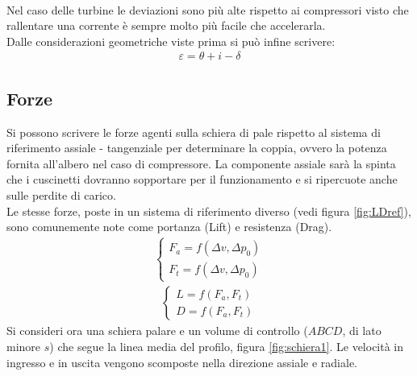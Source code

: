 \\Nel caso delle turbine le deviazioni sono più alte rispetto ai compressori visto che rallentare una corrente è sempre molto più facile che accelerarla.\\
Dalle considerazioni geometriche viste prima si può infine scrivere:
\begin{align*}
\varepsilon = \theta + i - \delta
\end{align*}
\subsection{Forze}
Si possono scrivere le forze agenti sulla schiera di pale rispetto al sistema di riferimento assiale - tangenziale per determinare la coppia, ovvero la potenza fornita all'albero nel caso di compressore. La componente assiale sarà la spinta che i cuscinetti dovranno sopportare per il funzionamento e si ripercuote anche sulle perdite di carico.\\
Le stesse forze, poste in un sistema di riferimento diverso (vedi figura \ref{fig:LDref}), sono comunemente note come portanza (Lift) e resistenza (Drag).\\
\begin{align*}
	\begin{cases}
		F_a = f(\Delta v, \Delta p_0)\\
		F_t = f(\Delta v, \Delta p_0)
	\end{cases}
\end{align*}
\begin{align*}
	\begin{cases}
		L = f(F_a,F_t)\\
		D = f(F_a,F_t)
	\end{cases}
\end{align*}
Si consideri ora una schiera palare e un volume di controllo ($ABCD$, di lato minore $s$) che segue la linea media del profilo, figura \ref{fig:schiera1}. Le velocità in ingresso e in uscita vengono scomposte nella direzione assiale e radiale. 
